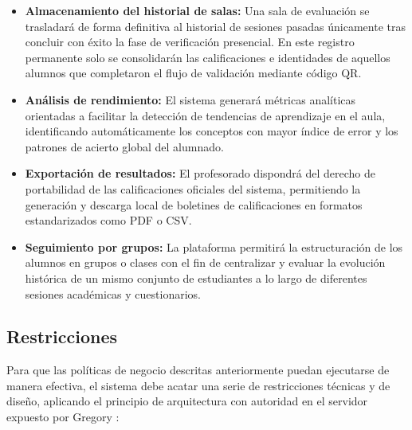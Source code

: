 \begin{itemize}
    \item \textbf{Almacenamiento del historial de salas:} Una sala de evaluación se trasladará de forma definitiva al historial de sesiones pasadas únicamente tras concluir con éxito la fase de verificación presencial. En este registro permanente solo se consolidarán las calificaciones e identidades de aquellos alumnos que completaron el flujo de validación mediante código QR.
    \item \textbf{Análisis de rendimiento:} El sistema generará métricas analíticas orientadas a facilitar la detección de tendencias de aprendizaje en el aula, identificando automáticamente los conceptos con mayor índice de error y los patrones de acierto global del alumnado.
    \item \textbf{Exportación de resultados:} El profesorado dispondrá del derecho de portabilidad de las calificaciones oficiales del sistema, permitiendo la generación y descarga local de boletines de calificaciones en formatos estandarizados como PDF o CSV.
    \item \textbf{Seguimiento por grupos:} La plataforma permitirá la estructuración de los alumnos en grupos o clases con el fin de centralizar y evaluar la evolución histórica de un mismo conjunto de estudiantes a lo largo de diferentes sesiones académicas y cuestionarios.
\end{itemize}

\subsection{Restricciones}\label{sub:restricciones}
Para que las políticas de negocio descritas anteriormente puedan ejecutarse de manera efectiva, el sistema debe acatar una serie de restricciones técnicas y de diseño, aplicando el principio de arquitectura con autoridad en el servidor expuesto por Gregory \cite{gregory2014game}:

